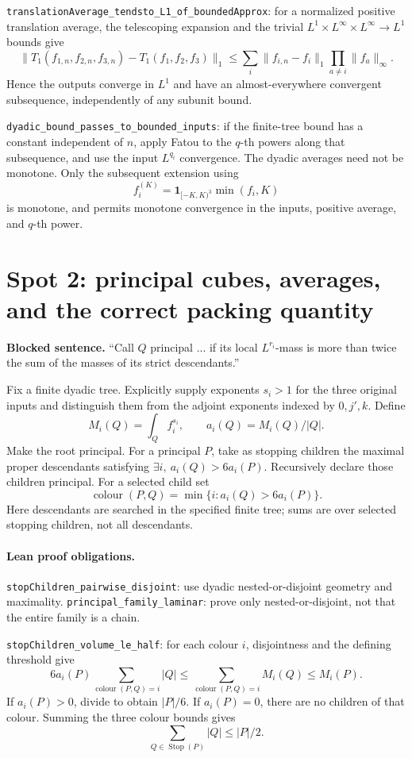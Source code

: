 \documentclass[11pt]{article}
\begin{document}
\texttt{translationAverage\_tendsto\_L1\_of\_boundedApprox}: for a normalized
positive translation average, the telescoping expansion and the trivial
$L^1\times L^\infty\times L^\infty\to L^1$ bounds give
\[
 \|T_1(f_{1,n},f_{2,n},f_{3,n})-T_1(f_1,f_2,f_3)\|_1
 \leq\sum_i\|f_{i,n}-f_i\|_1\prod_{a\ne i}\|f_a\|_\infty.
\]
Hence the outputs converge in $L^1$ and have an almost-everywhere
convergent subsequence, independently of any subunit bound.

\texttt{dyadic\_bound\_passes\_to\_bounded\_inputs}: if the finite-tree bound
has a constant independent of $n$, apply Fatou to the $q$-th powers along
that subsequence, and use the input $L^{q_i}$ convergence. The dyadic
averages need not be monotone. Only the subsequent extension using
\[
 f_i^{(K)}=\mathbf1_{[-K,K)^3}\min(f_i,K)
\]
is monotone, and permits monotone convergence in the inputs, positive
average, and $q$-th power.

\section{Spot 2: principal cubes, averages, and the correct packing quantity}
\textbf{Blocked sentence.} ``Call $Q$ principal ... if its local
$L^{r_i}$-mass is more than twice the sum of the masses of its strict
descendants.''

Fix a finite dyadic tree. Explicitly supply exponents $s_i>1$ for the
three original inputs and distinguish them from the adjoint exponents
indexed by $0,j',k$. Define
\[
 M_i(Q)=\int_Q f_i^{s_i},\qquad a_i(Q)=M_i(Q)/|Q|.
\]
Make the root principal. For a principal $P$, take as stopping children
the maximal proper descendants satisfying
$\exists i,\ a_i(Q)>6a_i(P)$. Recursively declare those children principal.
For a selected child set
\[
 \operatorname{colour}(P,Q)=\min\{i:a_i(Q)>6a_i(P)\}.
\]
Here descendants are searched in the specified finite tree; sums are over
selected stopping children, not all descendants.

\paragraph{Lean proof obligations.}
\texttt{stopChildren\_pairwise\_disjoint}: use dyadic nested-or-disjoint
geometry and maximality. \texttt{principal\_family\_laminar}: prove only
nested-or-disjoint, not that the entire family is a chain.

\texttt{stopChildren\_volume\_le\_half}: for each colour $i$, disjointness
and the defining threshold give
\[
 6a_i(P)\sum_{\operatorname{colour}(P,Q)=i}|Q|
 \leq\sum_{\operatorname{colour}(P,Q)=i}M_i(Q)\leq M_i(P).
\]
If $a_i(P)>0$, divide to obtain $|P|/6$. If $a_i(P)=0$, there are no
children of that colour. Summing the three colour bounds gives
\[
 \sum_{Q\in\operatorname{Stop}(P)}|Q|\leq |P|/2.
\]
\end{document}
